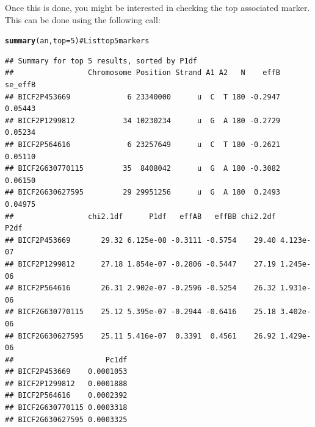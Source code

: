 \documentclass{article}\usepackage{graphicx, color}
\makeatletter
\newcommand{\hlfunctioncall}[1]{\textcolor[rgb]{0.501960784313725,0,0.329411764705882}{\textbf{#1}}}%
\newcommand{\hlcomment}[1]{\textcolor[rgb]{0.180392156862745,0.6,0.341176470588235}{#1}}%
\newenvironment{kframe}{%
 \def\at@end@of@kframe{}%
 \ifinner\ifhmode%
  \def\at@end@of@kframe{\end{minipage}}%
  \begin{minipage}{\columnwidth}%
 \fi\fi%
 \def\FrameCommand##1{\hskip\@totalleftmargin \hskip-\fboxsep
 \colorbox{shadecolor}{##1}\hskip-\fboxsep
     \hskip-\linewidth \hskip-\@totalleftmargin \hskip\columnwidth}%
 \MakeFramed {\advance\hsize-\width
   \@totalleftmargin\z@ \linewidth\hsize
   \@setminipage}}%
 {\par\unskip\endMakeFramed%
 \at@end@of@kframe}
\newenvironment{knitrout}{}{} %
\makeatother
\begin{document}
Once this is done, you might be interested in checking the top associated marker. This can be done using the following call:
\begin{knitrout}
\color{fgcolor}\begin{kframe}
\begin{alltt}
\hlfunctioncall{summary}(an, top = 5)  \hlcomment{# List top 5 markers}
\end{alltt}
\begin{verbatim}
## Summary for top 5 results, sorted by P1df
##                 Chromosome Position Strand A1 A2   N    effB se_effB
## BICF2P453669             6 23340000      u  C  T 180 -0.2947 0.05443
## BICF2P1299812           34 10230234      u  G  A 180 -0.2729 0.05234
## BICF2P564616             6 23257649      u  C  T 180 -0.2621 0.05110
## BICF2G630770115         35  8408042      u  G  A 180 -0.3082 0.06150
## BICF2G630627595         29 29951256      u  G  A 180  0.2493 0.04975
##                 chi2.1df      P1df   effAB   effBB chi2.2df      P2df
## BICF2P453669       29.32 6.125e-08 -0.3111 -0.5754    29.40 4.123e-07
## BICF2P1299812      27.18 1.854e-07 -0.2806 -0.5447    27.19 1.245e-06
## BICF2P564616       26.31 2.902e-07 -0.2596 -0.5254    26.32 1.931e-06
## BICF2G630770115    25.12 5.395e-07 -0.2944 -0.6416    25.18 3.402e-06
## BICF2G630627595    25.11 5.416e-07  0.3391  0.4561    26.92 1.429e-06
##                     Pc1df
## BICF2P453669    0.0001053
## BICF2P1299812   0.0001888
## BICF2P564616    0.0002392
## BICF2G630770115 0.0003318
## BICF2G630627595 0.0003325
\end{verbatim}
\end{kframe}
\end{knitrout}
\end{document}
